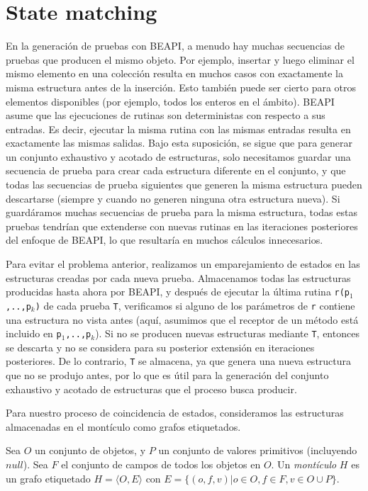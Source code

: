 
\section{State matching}
\label{sec:state-matching}

En la generación de pruebas con \textsf{BEAPI}, a menudo hay muchas secuencias de pruebas que producen el mismo objeto. Por ejemplo, insertar y luego eliminar el mismo elemento en una colección resulta en muchos casos con exactamente la misma estructura antes de la inserción. Esto también puede ser cierto para otros elementos disponibles (por ejemplo, todos los enteros en el ámbito). \textsf{BEAPI} asume que las ejecuciones de rutinas son deterministas con respecto a sus entradas. Es decir, ejecutar la misma rutina con las mismas entradas resulta en exactamente las mismas salidas. Bajo esta suposición, se sigue que para generar un conjunto exhaustivo y acotado de estructuras, solo necesitamos guardar una secuencia de prueba para crear cada estructura diferente en el conjunto, y que todas las secuencias de prueba siguientes que generen la misma estructura pueden descartarse (siempre y cuando no generen ninguna otra estructura nueva). Si guardáramos muchas secuencias de prueba para la misma estructura, todas estas pruebas tendrían que extenderse con nuevas rutinas en las iteraciones posteriores del enfoque de \textsf{BEAPI}, lo que resultaría en muchos cálculos innecesarios.

Para evitar el problema anterior, realizamos un emparejamiento de estados en las estructuras creadas por cada nueva prueba. Almacenamos todas las estructuras producidas hasta ahora por \textsf{BEAPI}, y después de ejecutar la última rutina \texttt{r(p$_1$,..,p$_k$)} de cada prueba \texttt{T}, verificamos si alguno de los parámetros de \texttt{r} contiene una estructura no vista antes (aquí, asumimos que el receptor de un método está incluido en \texttt{p$_1$,..,p$_k$}). Si no se producen nuevas estructuras mediante \texttt{T}, entonces se descarta y no se considera para su posterior extensión en iteraciones posteriores. De lo contrario, \texttt{T} se almacena, ya que genera una nueva estructura que no se produjo antes, por lo que es útil para la generación del conjunto exhaustivo y acotado de estructuras que el proceso busca producir.

Para nuestro proceso de coincidencia de estados, consideramos las estructuras almacenadas en el montículo como grafos etiquetados.

\begin{definition}
Sea $O$ un conjunto de objetos, y $P$ un conjunto de valores primitivos (incluyendo $null$). Sea $F$ el conjunto de campos de todos los objetos en $O$. Un \emph{montículo} $H$ es un grafo etiquetado $H = \langle O,E\rangle$ con $E = \{(o,f,v) | o \in O, f \in F, v \in O \cup P\}$.
\end{definition}



